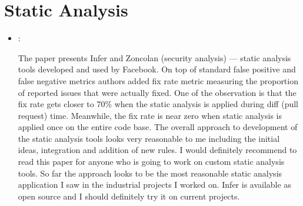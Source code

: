 \section*{Static Analysis}
\begin{itemize}
    \item \cite{Distefano:StaticAnalysisFB:2019}:

    The paper presents Infer and Zoncolan (security analysis) --- static analysis tools developed and used by Facebook. On top of standard false positive and false negative metrics authors added fix rate metric measuring the proportion of reported issues that were actually fixed. One of the observation is that the fix rate gets closer to 70\% when the static analysis is applied during diff (pull request) time. Meanwhile, the fix rate is near zero when static analysis is applied once on the entire code base. The overall approach to development of the static analysis tools looks very reasonable to me including the initial ideas, integration and addition of new rules. I would definitely recommend to read this paper for anyone who is going to work on custom static analysis tools. So far the approach looks to be the most reasonable static analysis application I saw in the industrial projects I worked on. Infer is available as open source and I should definitely try it on current projects.
\end{itemize}

